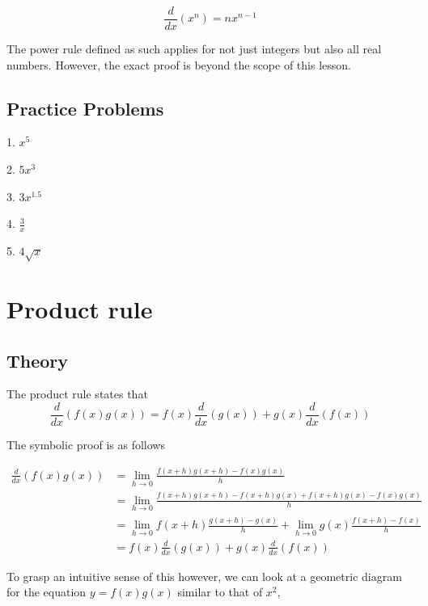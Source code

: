 \documentclass[a4paper,12pt,oneside]{book}
\begin{document}
$$\frac{d}{dx}(x^n)=nx^{n-1}$$

\noindent The power rule defined as such applies for not just integers but also all real numbers. However, the exact proof is beyond the scope of this lesson.

\subsection{Practice Problems}

1. $x^5$

2. $5x^3$

3. $3x^1.5$

4. $\frac{3}{x}$

5. $4\sqrt{x}$

\section{Product rule}

\subsection{Theory}

The product rule states that
$$\frac{d}{dx}(f(x)g(x))=f(x)\frac{d}{dx}(g(x))+g(x)\frac{d}{dx}(f(x))$$

\noindent The symbolic proof is as follows

$$
\begin{aligned}
\frac{d}{dx}(f(x)g(x))&=\lim_{h\to 0}\frac{f(x+h)g(x+h)-f(x)g(x)}{h}\\
&=\lim_{h\to 0}\frac{{f({x+h})g({x+h})-f({x+h})g(x)+f({x+h})g(x)-f(x)g(x)}}{h}\\
&=\lim_{h\to 0}f(x+h)\frac{g(x+h)-g(x)}{h}+\lim_{h\to 0}g(x)\frac{f(x+h)-f(x)}{h}\\
&=f(x)\frac{d}{dx}(g(x))+g(x)\frac{d}{dx}(f(x))
\end{aligned}
$$

\noindent To grasp an intuitive sense of this however, we can look at a geometric diagram for the equation $y=f(x)g(x)$ similar to that of $x^2$,
\end{document}
